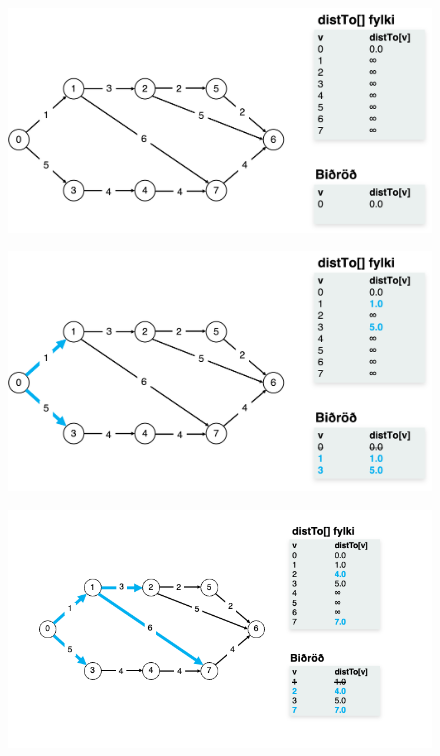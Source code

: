 \documentclass[12pt, a4paper, hidelinks]{article}
\begin{document}
\begin{figure}[H]
    \centering
    \includegraphics[width=\textwidth]{HD11/pdf/img/dijkstra/im1.png}
    \label{fig:dijkstra1}
\end{figure}

\begin{figure}[H]
    \centering
    \includegraphics[width=\textwidth]{HD11/pdf/img/dijkstra/im2.png}
    \label{fig:dijkstra2}
\end{figure}

\begin{figure}[H]
    \centering
    \includegraphics[width=\textwidth]{HD11/pdf/img/dijkstra/im3.png}
    \label{fig:dijkstra3}
\end{figure}
\end{document}
